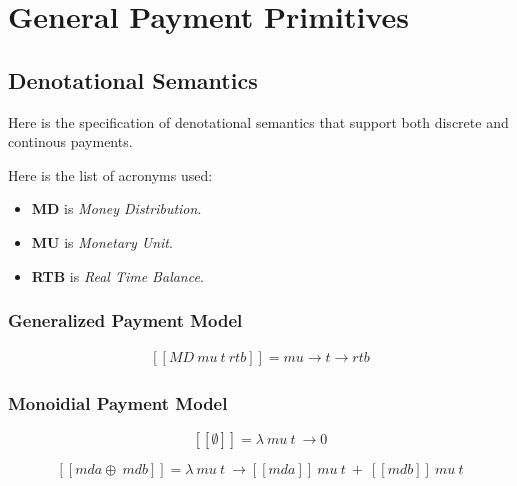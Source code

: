 \chapter{General Payment Primitives}

\section{Denotational Semantics}

Here is the specification of denotational semantics that support both discrete and continous payments.

Here is the list of acronyms used:

\begin{itemize}
    \item \textbf{MD} is \textit{Money Distribution}.
    \item \textbf{MU} is \textit{Monetary Unit}.
    \item \textbf{RTB} is \textit{Real Time Balance}.
\end{itemize}

\subsection{Generalized Payment Model}

\begin{equation}\label{sem_transfer}
    \begin{split}
        [\![MD\ mu\ t\ rtb]\!] = mu \rightarrow t \rightarrow rtb
    \end{split}
\end{equation}

\subsection{Monoidial Payment Model}

\begin{equation}\label{sem_mzero}
    [\![\emptyset]\!] = \lambda\ mu\ t\ \rightarrow 0
\end{equation}

\begin{equation}\label{sem_mappend}
    [\![mda \oplus\ mdb]\!] = \lambda\ mu\ t\ \rightarrow
    [\![mda]\!]\ mu\ t\ +\ [\![mdb]\!]\ mu\ t
\end{equation}

